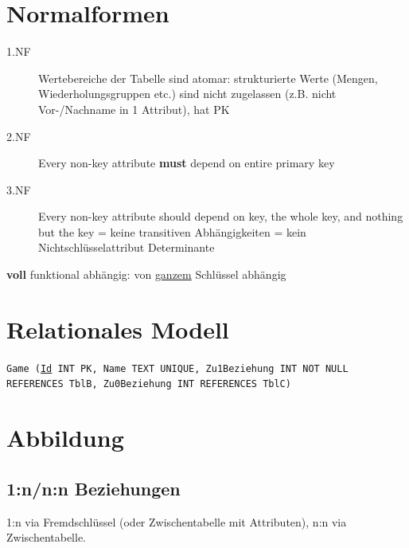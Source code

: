 
\newcommand{\TITLE}{Datenbanksysteme 1}
\newcommand{\AUTHOR}{Florian Bruhin, Mona Panchaud}
\newcommand{\INSTITUTE}{Ostschweizer Fachhochschule}


\footnotesize
\begin{multicols*}{3}

\setlength{\premulticols}{1pt}
\setlength{\postmulticols}{1pt}
\setlength{\multicolsep}{1pt}
\setlength{\columnsep}{2pt}

\section{Normalformen}
\begin{description}
    \item[1.NF] Wertebereiche der Tabelle sind atomar: strukturierte Werte (Mengen, Wiederholungsgruppen etc.) sind nicht zugelassen (z.B. nicht Vor-/Nachname in 1 Attribut), hat PK
    \item[2.NF] Every non-key attribute \textbf{must} depend on entire primary key
    \item[3.NF] Every non-key attribute should depend on key, the whole key, and nothing but the key = keine transitiven Abhängigkeiten = kein Nichtschlüsselattribut Determinante
\end{description}
\textbf{voll} funktional abhängig: von \underline{ganzem} Schlüssel abhängig

\section{Relationales Modell}

\texttt{Game (\underline{Id} INT PK, Name TEXT UNIQUE, Zu1Beziehung INT NOT NULL REFERENCES TblB, Zu0Beziehung INT REFERENCES TblC)}

\section{Abbildung}
\subsection{1:n/n:n Beziehungen}
1:n via Fremdschlüssel (oder Zwischentabelle mit Attributen), n:n via
Zwischentabelle.

\end{multicols*}
